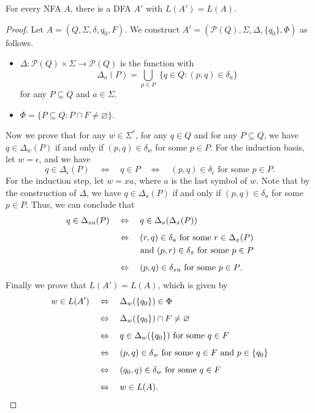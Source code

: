 \begin{theorem}
  For every NFA $A$, there is a DFA $A'$ with $L(A') = L(A)$.
\end{theorem}
\begin{proof}
  Let $A = (Q, \Sigma, \delta, q_0, F)$.
  We construct $A' = (\mathcal{P}(Q), \Sigma, \Delta, \{q_0\}, \Phi)$
  as follows.
  \begin{itemize}
    \item $\Delta: \mathcal{P}(Q) \times \Sigma \to \mathcal{P}(Q)$ is the
    function with
    \begin{equation*}
      \Delta_a(P) = \bigcup_{p \in P} \; \{q \in Q: (p, q) \in \delta_a\}
    \end{equation*}
    for any $P \subseteq Q$ and $a \in \Sigma$.
    \item $\Phi = \{P \subseteq Q: P \cap F \neq \varnothing\}$.
  \end{itemize}
  Now we prove that for any $w \in \Sigma^*$, for any $q \in Q$ and for any
  $P \subseteq Q$, we have $q \in \Delta_w(P)$ if and only if
  $(p, q) \in \delta_w$ for some $p \in P$.
  For the induction basis, let $w = \epsilon$, and we have
  \begin{equation*}
    q \in \Delta_\epsilon(P)
    \quad \Leftrightarrow \quad
    q \in P
    \quad \Leftrightarrow \quad
    \text{$(p, q) \in \delta_\epsilon$ for some $p \in P$}.
  \end{equation*}
  For the induction step, let $w = xa$, where $a$ is the last symbol of $w$.
  Note that by the construction of $\Delta$, we have $q \in \Delta_a(P)$ if and
  only if $(p, q) \in \delta_a$ for some $p \in P$.
  Thus, we can conclude that
  \begin{align*}
    q \in \Delta_{xa}(P)
    \quad &\Leftrightarrow \quad
    q \in \Delta_a(\Delta_x(P)) \\[.5em]
    \quad &\Leftrightarrow \quad
    \text{$(r, q) \in \delta_a$ for some $r \in \Delta_x(P)$} \\
    &\hspace*{2.6em} \text{and $(p, r) \in \delta_x$ for some $p \in P$}
    \\[.5em]
    \quad &\Leftrightarrow \quad
    \text{$(p, q) \in \delta_{xa}$ for some $p \in P$}.
  \end{align*}
  Finally we prove that $L(A') = L(A)$, which is given by
  \begin{align*}
    w \in L(A')
    \quad &\Leftrightarrow \quad
    \Delta_w(\{q_0\}) \in \Phi \\[.5em]
    \quad &\Leftrightarrow \quad
    \Delta_w(\{q_0\}) \cap F \neq \varnothing \\[.5em]
    \quad &\Leftrightarrow \quad
    \text{$q \in \Delta_w(\{q_0\})$ for some $q \in F$} \\[.5em]
    \quad &\Leftrightarrow \quad
    \text{$(p, q) \in \delta_w$ for some $q \in F$ and $p \in \{q_0\}$} \\[.5em]
    \quad &\Leftrightarrow \quad
    \text{$(q_0, q) \in \delta_w$ for some $q \in F$} \\[.5em]
    \quad &\Leftrightarrow \quad
    w \in L(A).
    \qedhere
  \end{align*}
\end{proof}

